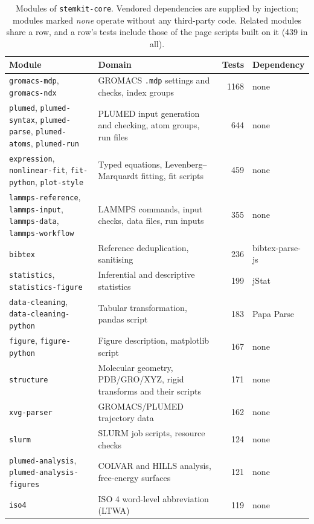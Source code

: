 \documentclass[11pt,a4paper]{article}
\begin{document}
\begin{table}[htbp]
\centering
\caption{Modules of \texttt{stemkit-core}. Vendored dependencies are supplied
by injection; modules marked \emph{none} operate without any third-party code.
Related modules share a row, and a row's tests include those of the page
scripts built on it (439 in all).}
\label{tab:modules}
\scriptsize
\begin{tabular}{@{}>{\raggedright\arraybackslash}p{4.4cm}>{\raggedright\arraybackslash}p{5.3cm}rl@{}}
\toprule
\textbf{Module} & \textbf{Domain} & \textbf{Tests} & \textbf{Dependency} \\
\midrule
\texttt{gromacs-mdp}, \texttt{gromacs-ndx} & GROMACS \texttt{.mdp} settings and checks, index groups & 1168 & none \\
\texttt{plumed}, \texttt{plumed-syntax}, \texttt{plumed-parse}, \texttt{plumed-atoms}, \texttt{plumed-run} & PLUMED input generation and checking, atom groups, run files & 644 & none \\
\texttt{expression}, \texttt{nonlinear-fit}, \texttt{fit-python}, \texttt{plot-style} & Typed equations, Levenberg--Marquardt fitting, fit scripts & 459 & none \\
\texttt{lammps-reference}, \texttt{lammps-input}, \texttt{lammps-data}, \texttt{lammps-workflow} & LAMMPS commands, input checks, data files, run inputs & 355 & none \\
\texttt{bibtex} & Reference deduplication, sanitising & 236 & bibtex-parse-js \\
\texttt{statistics}, \texttt{statistics-figure} & Inferential and descriptive statistics & 199 & jStat \\
\texttt{data-cleaning}, \texttt{data-cleaning-python} & Tabular transformation, pandas script & 183 & Papa Parse \\
\texttt{figure}, \texttt{figure-python} & Figure description, matplotlib script & 167 & none \\
\texttt{structure} & Molecular geometry, PDB/GRO/XYZ, rigid transforms and their scripts & 171 & none \\
\texttt{xvg-parser} & GROMACS/PLUMED trajectory data & 162 & none \\
\texttt{slurm} & SLURM job scripts, resource checks & 124 & none \\
\texttt{plumed-analysis}, \texttt{plumed-analysis-figures} & COLVAR and HILLS analysis, free-energy surfaces & 121 & none \\
\texttt{iso4} & ISO 4 word-level abbreviation (LTWA) & 119 & none \\

\end{tabular}
\end{table}
\end{document}
